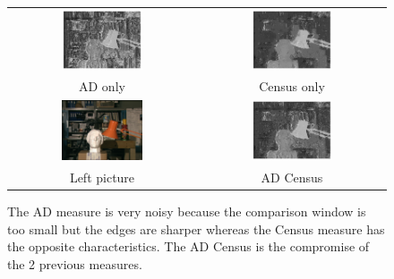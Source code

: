 \documentclass{ipol}
\begin{document}
\begin{figure}[h]
\begin{center}	
\begin{tabular}{cc}
\includegraphics[width=0.45\textwidth]{Images/tsukuba/disparity_map_AD_only.png} &
\includegraphics[width=0.45\textwidth]{Images/tsukuba/disparity_map_Census_only.png}\\
AD only & Census only\\
\includegraphics[width=0.45\textwidth]{Images/pictures/tsukuba.png} &
\includegraphics[width=0.45\textwidth]{Images/tsukuba/disparity_map_ADCensus_only.png}
\\
Left picture & AD Census 
\end{tabular}
	\caption{The AD measure is very noisy because the comparison window is too small but the edges are sharper whereas the Census measure has the opposite characteristics. The AD Census is the compromise of the 2 previous measures.}
	\label{ADCensusPics}
\end{center}
\end{figure}
\end{document}
